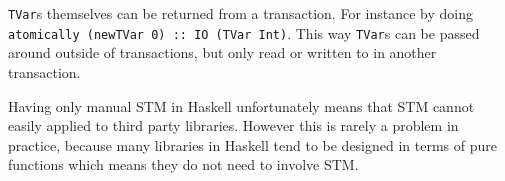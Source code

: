 \texttt{TVar}s themselves can be returned from a transaction. For instance by
doing \texttt{atomically (newTVar 0) :: IO (TVar Int)}. This way \texttt{TVar}s
can be passed around outside of transactions, but only read or written to in
another transaction.

Having only manual STM in Haskell unfortunately means that STM cannot easily
applied to third party libraries. However this is rarely a problem in practice,
because many libraries in Haskell tend to be designed in terms of pure functions
which means they do not need to involve STM.
